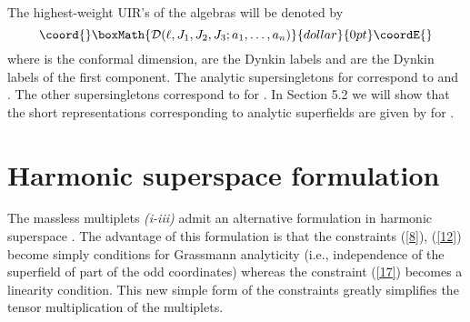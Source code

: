 \documentclass[a4paper,12pt]{article}
\begin{document}
The highest-weight UIR's of the \coordHE{} algebras will be denoted by 
$$\coord{}\boxMath{
{\cal D}(\ell,J_1,J_2,J_3;a_1,\ldots, a_n)
}{dollar}{0pt}\coordE{}$$
where \myHighlight{$\ell$}\coordHE{} is the conformal dimension, \coordHE{} are the 
\coordHE{} Dynkin labels and \coordHE{} are the \coordHE{}  Dynkin labels of the first component. The analytic 
supersingletons for \coordHE{} correspond to \coordHE{} 
and \coordHE{}. The other supersingletons correspond 
to \coordHE{} for \coordHE{}. In Section 5.2 
we will show that the short representations corresponding to 
analytic superfields are given by \coordHE{} for 
\coordHE{}. 



\section{Harmonic superspace formulation}

The massless multiplets {\sl (i-iii)} admit an alternative 
formulation in harmonic superspace \cite{GIKOS,HStT,Howe}. The advantage of 
this formulation is that the constraints (\ref{8}), (\ref{12}) 
become simply conditions for Grassmann analyticity (i.e., 
independence of the superfield of part of the odd coordinates) 
whereas the constraint (\ref{17}) becomes a linearity condition. 
This new simple form of the constraints greatly simplifies the 
tensor multiplication of the multiplets. 
\end{document}
